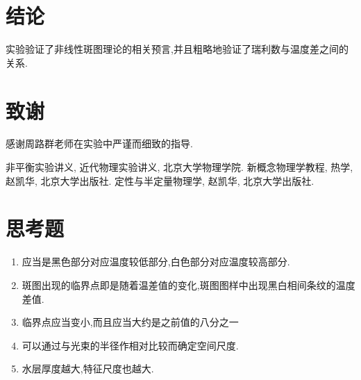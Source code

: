 \documentclass[aps,pre,12pt,preprint,onecolumn,showpacs,showkeys,floatfix]{revtex4-1}
\begin{document}
\section{结论}

实验验证了非线性斑图理论的相关预言,并且粗略地验证了瑞利数与温度差之间的关系.

\section{致谢}


感谢周路群老师在实验中严谨而细致的指导.

\begin{thebibliography}{}
 非平衡实验讲义, 近代物理实验讲义,  北京大学物理学院.
 新概念物理学教程, 热学, 赵凯华, 北京大学出版社.
 定性与半定量物理学, 赵凯华, 北京大学出版社.
\end{thebibliography}

\clearpage
\appendix
\section{思考题}

\begin{enumerate}
    \item 应当是黑色部分对应温度较低部分,白色部分对应温度较高部分.
    \item 斑图出现的临界点即是随着温差值的变化,斑图图样中出现黑白相间条纹的温度
        差值.
    \item 临界点应当变小,而且应当大约是之前值的八分之一
    \item 可以通过与光束的半径作相对比较而确定空间尺度.
    \item 水层厚度越大,特征尺度也越大.
\end{enumerate}
\end{document}
